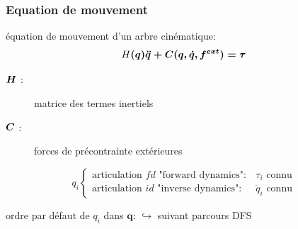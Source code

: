 \documentclass[10pt]{beamer}
\begin{document}
\begin{frame}

  \frametitle{Equation de mouvement}
  
  \begin{block}{équation de mouvement d'un arbre cinématique:}
  \begin{equation} \label{equ_equationMvt}
	H\boldsymbol{(q) \ddot{q} + C(q,\dot{q},f^{ext}) = \tau}
	\end{equation}
  \end{block}
  
  \begin{description}
    \item[$\boldsymbol{H}$ :] matrice des termes inertiels
    \item[$\boldsymbol{C}$ :] forces de précontrainte extérieures
  \end{description}
  
  \begin{equation*}
  q_i
  \begin{cases}
  \text{articulation $fd$ "forward dynamics"}: &\tau_i \text{ connu} \\
  \text{articulation $id$ "inverse dynamics"}: &\ddot{q}_i \text{ connu}
  \end{cases}
  \end{equation*}
  
  \bigskip
  ordre par défaut de $q_i$ dans $\boldsymbol{q}$:
  $\hookrightarrow$ suivant parcours DFS
  

\end{frame}
\end{document}
